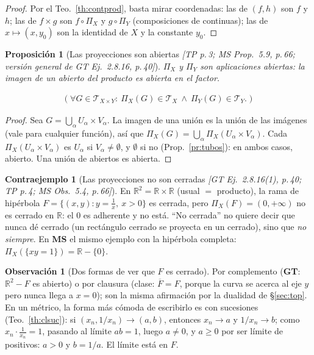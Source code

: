 \documentclass[11pt,a4paper]{article}
\newcommand{\lgc}[1]{\par\vspace{-3pt}\begin{gather*}\big(\;#1\;\big)\end{gather*}\vspace{-6pt}}
\theoremstyle{definition}
\newtheorem{observacion}[definicion]{Observación}
\newtheorem{contraejemplo}[definicion]{Contraejemplo}
\theoremstyle{plain}
\newtheorem{proposicion}[definicion]{Proposición}
\newcommand{\fnt}[1]{{\normalfont\small\itshape\color{gray!150!black}[#1]}}
\newcommand{\R}{\mathbb{R}}
\newcommand{\cl}[1]{\overline{#1}}
\newcommand{\tp}{\mathcal{T}}
\begin{document}
\begin{proof}
Por el Teo.~\ref{th:contprod}, basta mirar coordenadas: las de $(f,h)$ son $f$ y $h$; las de $f\times g$ son $f\circ\Pi_X$ y $g\circ\Pi_Y$ (composiciones de continuas); las de $x\mapsto(x,y_0)$ son la identidad de $X$ y la constante $y_0$.
\end{proof}

\begin{proposicion}[Las proyecciones son abiertas \fnt{TP p.\,3; MS Prop.\ 5.9, p.\,66; versión general de GT Ej.\ 2.8.16, p.\,40}]\label{pr:proyab}
$\Pi_X$ y $\Pi_Y$ son aplicaciones abiertas: la imagen de un abierto del producto es abierta en el factor.
\lgc{\forall G\in\tp_{X\times Y}:\ \Pi_X(G)\in\tp_X\ \wedge\ \Pi_Y(G)\in\tp_Y.}
\end{proposicion}

\begin{proof}
Sea $G=\bigcup_\alpha U_\alpha\times V_\alpha$. La imagen de una unión es la unión de las imágenes (vale para cualquier función), así que $\Pi_X(G)=\bigcup_\alpha\Pi_X(U_\alpha\times V_\alpha)$. Cada $\Pi_X(U_\alpha\times V_\alpha)$ es $U_\alpha$ si $V_\alpha\ne\emptyset$, y $\emptyset$ si no (Prop.~\ref{pr:tubos}): en ambos casos, abierto. Una unión de abiertos es abierta.
\end{proof}

\begin{contraejemplo}[Las proyecciones no son cerradas \fnt{GT Ej.\ 2.8.16(1), p.\,40; TP p.\,4; MS Obs.\ 5.4, p.\,66}]
En $\R^2=\R\times\R$ (usual $=$ producto), la rama de hipérbola $F=\{(x,y): y=\tfrac1x,\ x>0\}$ es cerrada, pero $\Pi_X(F)=(0,+\infty)$ no es cerrado en $\R$: el $0$ es adherente y no está. ``No cerrada'' no quiere decir que nunca dé cerrado (un rectángulo cerrado se proyecta en un cerrado), sino que \emph{no siempre}. En \textbf{MS} el mismo ejemplo con la hipérbola completa: $\Pi_X(\{xy=1\})=\R-\{0\}$.
\end{contraejemplo}

\begin{observacion}[Dos formas de ver que $F$ es cerrado]
Por complemento (\textbf{GT}: $\R^2-F$ es abierto) o por clausura (clase: $\cl F=F$, porque la curva se acerca al eje $y$ pero nunca llega a $x=0$); son la misma afirmación por la dualidad de \S\ref{sec:top}. En un métrico, la forma más cómoda de escribirlo es con sucesiones (Teo.~\ref{th:clsuc}): si $(x_n,1/x_n)\to(a,b)$, entonces $x_n\to a$ y $1/x_n\to b$; como $x_n\cdot\tfrac1{x_n}=1$, pasando al límite $ab=1$, luego $a\ne0$, y $a\ge0$ por ser límite de positivos: $a>0$ y $b=1/a$. El límite está en $F$.
\end{observacion}
\end{document}
